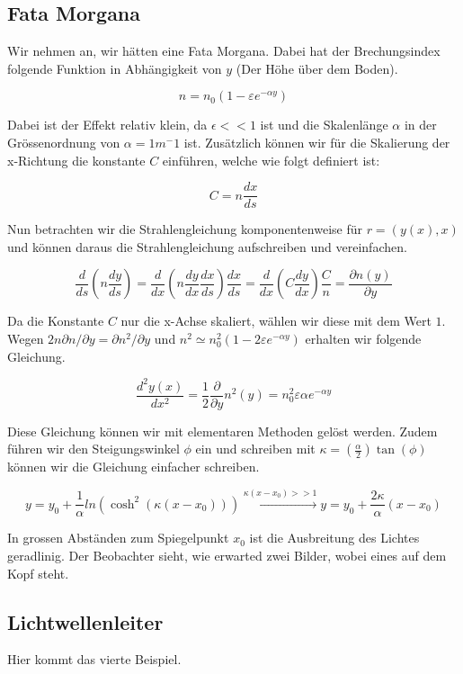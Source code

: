 \subsection{Fata Morgana}
Wir nehmen an, wir hätten eine Fata Morgana. 
Dabei hat der Brechungsindex folgende Funktion in Abhängigkeit von $y$ 
(Der Höhe über dem Boden).

\[
n = n_0 (1 - \varepsilon e^{- \alpha y})
\]

Dabei ist der Effekt relativ klein, da $\epsilon << 1$ ist und 
die Skalenlänge $\alpha$ in der Grössenordnung von $\alpha = 1 m^-1$ ist.
Zusätzlich können wir für die Skalierung der x-Richtung die konstante $C$ einführen,
welche wie folgt definiert ist:

\[
C = n \frac{dx}{ds}
\]

Nun betrachten wir die Strahlengleichung komponentenweise für $r = (y(x), x)$ 
und können daraus die Strahlengleichung aufschreiben und vereinfachen.

\[
\frac{d}{ds} \left ( n \frac{dy}{ds} \right ) =
\frac{d}{dx} \left ( n \frac{dy}{dx} \frac{dx}{ds} \right ) \frac{dx}{ds} =
\frac{d}{dx} \left ( C \frac{dy}{dx} \right ) \frac{C}{n} =
\frac{\partial n(y)}{\partial y}
\]

Da die Konstante $C$ nur die x-Achse skaliert, wählen wir diese mit dem Wert $1$.
Wegen $2 n \partial n / \partial y = \partial n^2 / \partial y$ und 
$n^2 \simeq n_0^2(1 - 2 \varepsilon e^{-\alpha y})$ erhalten wir folgende Gleichung.

\[
\frac{d^2 y(x)}{dx^2} =
\frac{1}{2} \frac{\partial}{\partial y} n^2(y) =
n_0^2 \varepsilon \alpha e^{-\alpha y}
\]

Diese Gleichung können wir mit elementaren Methoden gelöst werden. 
Zudem führen wir den Steigungswinkel $\phi$ ein und schreiben mit 
$\kappa = (\frac{\alpha}{2}) \tan(\phi)$ können wir die Gleichung einfacher schreiben.

\[
y =
y_0 + \frac{1}{\alpha} ln(\cosh^2(\kappa(x - x_0))) \xrightarrow{\kappa (x - x_0 ) >> 1}
y =
y_0 + \frac{2 \kappa}{\alpha} (x - x_0)
\]

In grossen Abständen zum Spiegelpunkt $x_0$ ist die Ausbreitung des Lichtes geradlinig.
Der Beobachter sieht, wie erwarted zwei Bilder, wobei eines auf dem Kopf steht.

\subsection{Lichtwellenleiter}

Hier kommt das vierte Beispiel.